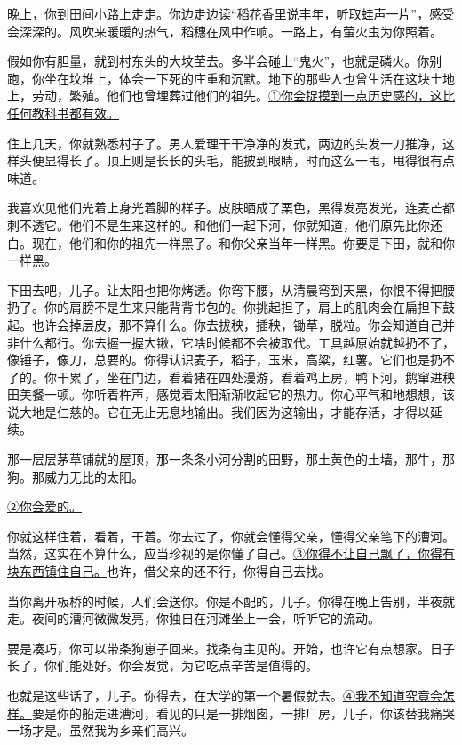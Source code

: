 \documentclass{exam-zh}
\begin{document}
\begin{material}[title=给儿子,author=陈村,source=1984.8.5\\(有删改）
]
晚上，你到田间小路上走走。你边走边读“稻花香里说丰年，听取蛙声一片”，感受会深深的。风吹来暖暖的热气，稻穗在风中作响。一路上，有萤火虫为你照着。

假如你有胆量，就到村东头的大坟茔去。多半会碰上“鬼火”，也就是磷火。你别跑，你坐在坟堆上，体会一下死的庄重和沉默。地下的那些人也曾生活在这块土地上，劳动，繁殖。他们也曾埋葬过他们的祖先。\underline{①你会捉摸到一点历史感的，这比任何教科书都有效。}

住上几天，你就熟悉村子了。男人爱理干干净净的发式，两边的头发一刀推净，这样头便显得长了。顶上则是长长的头毛，能披到眼睛，时而这么一甩，甩得很有点味道。

我喜欢见他们光着上身光着脚的样子。皮肤晒成了栗色，黑得发亮发光，连麦芒都刺不透它。他们不是生来这样的。和他们一起下河，你就知道，他们原先比你还白。现在，他们和你的祖先一样黑了。和你父亲当年一样黑。你要是下田，就和你一样黑。

下田去吧，儿子。让太阳也把你烤透。你弯下腰，从清晨弯到天黑，你恨不得把腰扔了。你的肩膀不是生来只能背背书包的。你挑起担子，肩上的肌肉会在扁担下鼓起。也许会掉层皮，那不算什么。你去拔秧，插秧，锄草，脱粒。你会知道自己并非什么都行。你去握一握大锹，它啥时候都不会被取代。工具越原始就越扔不了，像锤子，像刀，总要的。你得认识麦子，稻子，玉米，高粱，红薯。它们也是扔不了的。你干累了，坐在门边，看着猪在四处漫游，看着鸡上房，鸭下河，鹅窜进秧田美餐一顿。你听着杵声，感觉着太阳渐渐收起它的热力。你心平气和地想想，该说大地是仁慈的。它在无止无息地输出。我们因为这输出，才能存活，才得以延续。

那一层层茅草铺就的屋顶，那一条条小河分割的田野，那土黄色的土墙，那牛，那狗。那威力无比的太阳。

\underline{②你会爱的。}

你就这样住着，看着，干着。你去过了，你就会懂得父亲，懂得父亲笔下的漕河。当然，这实在不算什么，应当珍视的是你懂了自己。\underline{③你得不让自己飘了，你得有块东西镇住自己。}也许，借父亲的还不行，你得自己去找。

当你离开板桥的时候，人们会送你。你是不配的，儿子。你得在晚上告别，半夜就走。夜间的漕河微微发亮，你独自在河滩坐上一会，听听它的流动。

要是凑巧，你可以带条狗崽子回来。找条有主见的。开始，也许它有点想家。日子长了，你们能处好。你会发觉，为它吃点辛苦是值得的。

也就是这些话了，儿子。你得去，在大学的第一个暑假就去。\underline{④我不知道究竟会怎样。}要是你的船走进漕河，看见的只是一排烟囱，一排厂房，儿子，你该替我痛哭一场才是。虽然我为乡亲们高兴。

\end{material}
\end{document}
